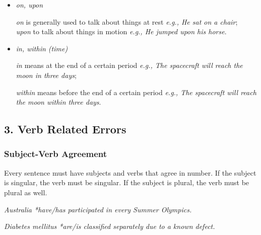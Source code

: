 \documentclass[12pt]{article}
\begin{document}
\begin{itemize}[-]
{\it by} is used to show the latest time at which an action will be finished {\it e.g., I shall be leaving by 6 o' clock}.

\item {\it on, upon}

{\it on} is generally used to talk about things at rest {\it e.g., He sat on a chair};\\
{\it upon} to talk about things in motion {\it e.g., He jumped upon his horse}.

\item {\it in, within (time)}

{\it in} means at the end of a certain period {\it e.g., The spacecraft will reach the moon in three days};

{\it within} means before the end of a certain period {\it e.g., The spacecraft will reach the moon within three days}.
\end{itemize}

\subsection{3. Verb Related Errors}

\subsubsection{Subject-Verb Agreement}
Every sentence must have subjects and verbs that agree in number. If the subject is singular, the verb must be singular. If the subject is plural, the verb must be plural as well.

{\it Australia *have/has participated in every Summer Olympics.}

{\it Diabetes mellitus *are/is classified separately due to a known defect.}


\end{document}
